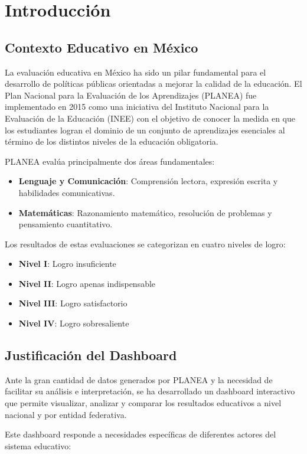 \chapter{Introducción}

\section{Contexto Educativo en México}
La evaluación educativa en México ha sido un pilar fundamental para el desarrollo de políticas públicas orientadas a mejorar la calidad de la educación. El Plan Nacional para la Evaluación de los Aprendizajes (PLANEA) fue implementado en 2015 como una iniciativa del Instituto Nacional para la Evaluación de la Educación (INEE) con el objetivo de conocer la medida en que los estudiantes logran el dominio de un conjunto de aprendizajes esenciales al término de los distintos niveles de la educación obligatoria.

PLANEA evalúa principalmente dos áreas fundamentales:
\begin{itemize}
    \item \textbf{Lenguaje y Comunicación}: Comprensión lectora, expresión escrita y habilidades comunicativas.
    \item \textbf{Matemáticas}: Razonamiento matemático, resolución de problemas y pensamiento cuantitativo.
\end{itemize}

Los resultados de estas evaluaciones se categorizan en cuatro niveles de logro:
\begin{itemize}
    \item \textbf{Nivel I}: Logro insuficiente
    \item \textbf{Nivel II}: Logro apenas indispensable
    \item \textbf{Nivel III}: Logro satisfactorio
    \item \textbf{Nivel IV}: Logro sobresaliente
\end{itemize}

\section{Justificación del Dashboard}
Ante la gran cantidad de datos generados por PLANEA y la necesidad de facilitar su análisis e interpretación, se ha desarrollado un dashboard interactivo que permite visualizar, analizar y comparar los resultados educativos a nivel nacional y por entidad federativa.

Este dashboard responde a necesidades específicas de diferentes actores del sistema educativo:

